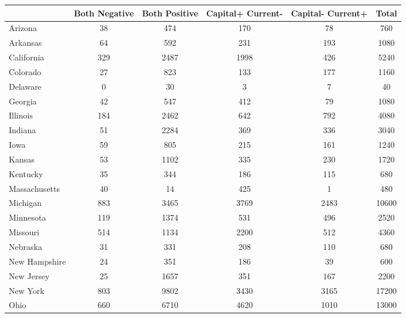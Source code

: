 
\begin{tabular}{l*{5}{c}}
\toprule
            &Both Negative&Both Positive&Capital+ Current-&Capital- Current+&       Total\\
\midrule
Arizona     &          38&         474&         170&          78&         760\\
Arkansas    &          64&         592&         231&         193&        1080\\
California  &         329&        2487&        1998&         426&        5240\\
Colorado    &          27&         823&         133&         177&        1160\\
Delaware    &           0&          30&           3&           7&          40\\
Georgia     &          42&         547&         412&          79&        1080\\
Illinois    &         184&        2462&         642&         792&        4080\\
Indiana     &          51&        2284&         369&         336&        3040\\
Iowa        &          59&         805&         215&         161&        1240\\
Kansas      &          53&        1102&         335&         230&        1720\\
Kentucky    &          35&         344&         186&         115&         680\\
Massachusetts&          40&          14&         425&           1&         480\\
Michigan    &         883&        3465&        3769&        2483&       10600\\
Minnesota   &         119&        1374&         531&         496&        2520\\
Missouri    &         514&        1134&        2200&         512&        4360\\
Nebraska    &          31&         331&         208&         110&         680\\
New Hampshire&          24&         351&         186&          39&         600\\
New Jersey  &          25&        1657&         351&         167&        2200\\
New York    &         803&        9802&        3430&        3165&       17200\\
Ohio        &         660&        6710&        4620&        1010&       13000\\

\end{tabular}
